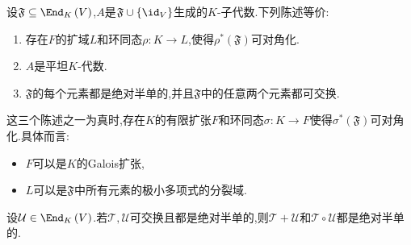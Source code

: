 \begin{proposition}{}{}
	设$\mathfrak{F}\subseteq\End_{K}\left(V\right)$,$A$是$\mathfrak{F}\cup\left\{\id_{V}\right\}$生成的$K$-子代数.下列陈述等价:
	\begin{enumerate}
		\item 存在$F$的扩域$L$和环同态$\rho:K\to L$,使得$\rho^{\ast}\left(\mathfrak{F}\right)$可对角化.
		\item $A$是平坦$K$-代数.
		\item $\mathfrak{F}$的每个元素都是绝对半单的,并且$\mathfrak{F}$中的任意两个元素都可交换.
	\end{enumerate}
\end{proposition}

\begin{remark}{}{}
	这三个陈述之一为真时,存在$K$的有限扩张$F$和环同态$\sigma:K\to F$使得$\sigma^{\ast}\left(\mathfrak{F}\right)$可对角化.具体而言:
	\begin{itemize}
		\item $F$可以是$K$的Galois扩张,
		\item $L$可以是$\mathfrak{F}$中所有元素的极小多项式的分裂域.
	\end{itemize}
\end{remark}

\begin{corollary}{}{}
	设$\mathcal{U}\in\End_{K}\left(V\right)$.若$\mathcal{T},\mathcal{U}$可交换且都是绝对半单的,则$\mathcal{T}+\mathcal{U}$和$\mathcal{T}\circ\mathcal{U}$都是绝对半单的.
\end{corollary}